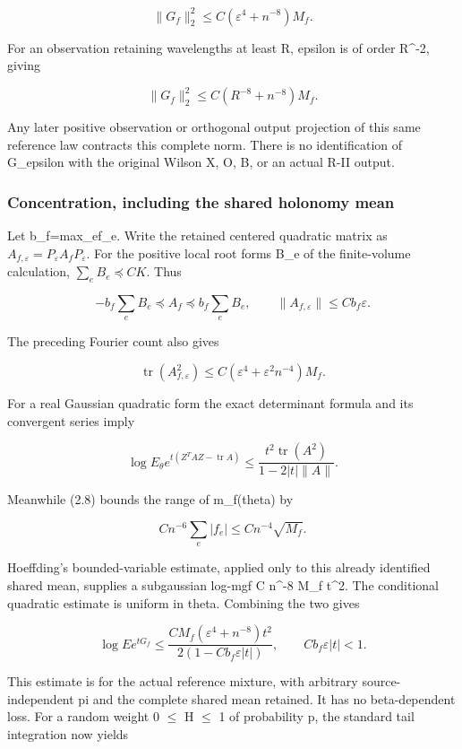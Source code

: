 \documentclass[
  11pt,
]{article}
\begin{document}
\[
 \|G_f\|_2^2\le C(\varepsilon^4+n^{-8})M_f.
\tag{3.6}
\]

For an observation retaining wavelengths at least R, epsilon is of order
R\^{}-2, giving

\[
 \|G_f\|_2^2\le C(R^{-8}+n^{-8})M_f.
\tag{3.7}
\]

Any later positive observation or orthogonal output projection of this
same reference law contracts this complete norm. There is no
identification of G\_epsilon with the original Wilson X, O, B, or an
actual R-II output.

\hypertarget{concentration-including-the-shared-holonomy-mean}{%
\subsubsection{Concentration, including the shared holonomy
mean}\label{concentration-including-the-shared-holonomy-mean}}

Let b\_f=max\_e\textbar f\_e\textbar. Write the retained centered
quadratic matrix as
\(A_{f,\varepsilon}=P_\varepsilon A_fP_\varepsilon\). For the positive
local root forms B\_e of the finite-volume calculation, \(\sum_e B_e\preceq CK\). Thus

\[
 -b_f\sum_eB_e\preceq A_f\preceq b_f\sum_eB_e,
 \qquad
 \|A_{f,\varepsilon}\|\le Cb_f\varepsilon.
\tag{3.8}
\]

The preceding Fourier count also gives

\[
 \operatorname{tr}(A_{f,\varepsilon}^2)
 \le C(\varepsilon^4+\varepsilon^2n^{-4})M_f.
\tag{3.9}
\]

For a real Gaussian quadratic form the exact determinant formula and its
convergent series imply

\[
 \log E_\theta e^{t(Z^TAZ-\operatorname{tr}A)}
 \le\frac{t^2\operatorname{tr}(A^2)}{1-2|t|\|A\|}.
\tag{3.10}
\]

Meanwhile (2.8) bounds the range of m\_f(theta) by

\[
 Cn^{-6}\sum_e|f_e|
 \le Cn^{-4}\sqrt{M_f}.
\]

Hoeffding's bounded-variable estimate, applied only to this already
identified shared mean, supplies a subgaussian log-mgf C n\^{}-8 M\_f
t\^{}2. The conditional quadratic estimate is uniform in theta.
Combining the two gives

\[
 \boxed{\quad
 \log E e^{tG_f}
 \le\frac{C M_f(\varepsilon^4+n^{-8})t^2}
               {2(1-C b_f\varepsilon|t|)},
 \qquad Cb_f\varepsilon|t|<1.
 \quad}
\tag{3.11}
\]

This estimate is for the actual reference mixture, with arbitrary
source-independent pi and the complete shared mean retained. It has no
beta-dependent loss. For a random weight 0 \(\leq\) H \(\leq\) 1 of
probability p, the standard tail integration now yields
\end{document}
